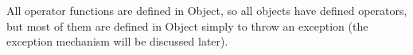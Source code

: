 \begin{comment}
<table border="0" cellspacing="0" cellpadding="0" class="Table6"><colgroup><col width="384"/><col width="384"/></colgroup><tr><td style="text-align:left;width:3.4625in; " class="Table6_A1"><p class="P25">Operator

</td><td style="text-align:left;width:3.4625in; " class="Table6_B1"><p class="P25">Equivalence

</td></tr><tr><td style="text-align:left;width:3.4625in; " class="Table6_A2"><p class="P24">x &lt; y

</td><td style="text-align:left;width:3.4625in; " class="Table6_B2"><p class="P24">x.opCmp(y) &lt; 0

</td></tr><tr><td style="text-align:left;width:3.4625in; " class="Table6_A3"><p class="P24">x &lt;= y

</td><td style="text-align:left;width:3.4625in; " class="Table6_B3"><p class="P24">x.opCmp(y) &lt;= 0

</td></tr><tr><td style="text-align:left;width:3.4625in; " class="Table6_A3"><p class="P24">x &gt; y

</td><td style="text-align:left;width:3.4625in; " class="Table6_B3"><p class="P24">x.opCmp(y) &gt; 0

</td></tr><tr><td style="text-align:left;width:3.4625in; " class="Table6_A3"><p class="P24">x &gt;= y

</td><td style="text-align:left;width:3.4625in; " class="Table6_B3"><p class="P24">x.opCmp(y) &gt;= 0

</td></tr><tr><td style="text-align:left;width:3.4625in; " class="Table6_A3"><p class="P24">x as y

</td><td style="text-align:left;width:3.4625in; " class="Table6_B3"><p class="P24">Multiple steps:

<p class="P24">1) If x is derived from y (determined by

<p class="P24"><span class="T6">  </span>opIs), returns x.

<p class="P24">2) x.opCastTo(y)

<p class="P24">3) if opCastTo returned null,<br/>  y.opCastFrom(x)

<p class="P24">4) if opCastFrom returned null, null

</td></tr></table><p class="P5">
\end{comment}

All operator functions are defined in Object, so all objects have defined operators, but most of them are defined in Object simply to throw an exception (the exception mechanism will be discussed later).

